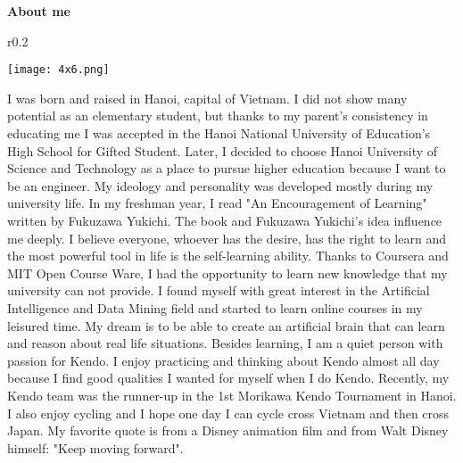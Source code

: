 \documentclass[a4paper,11pt]{article}
\newcommand{\resheading}[1]{{\large \colorbox{mygrey}{\begin{minipage}{\textwidth}{\textbf{#1 \vphantom{p\^{E}}}}\end{minipage}}}}
\begin{document}
\resheading{About me}

\begin{minipage}{\textwidth}
\begin{wrapfigure}{r}{0.2\textwidth}
  \vspace{-13pt}
  \begin{center}
    \texttt{[image: 4x6.png]}
  \end{center}
  \vspace{-20pt}
\end{wrapfigure}
\vspace{1em}
I was born and raised in Hanoi, capital of Vietnam. I did not show many potential as an elementary student, but thanks to my parent's consistency in educating me I was accepted in the Hanoi National University of Education's High School for Gifted Student. Later, I decided to choose Hanoi University of Science and Technology as a place to pursue higher education because I want to be an engineer. My ideology and personality was developed mostly during my university life. In my freshman year, I read "An Encouragement of Learning" written by Fukuzawa Yukichi. The book and Fukuzawa Yukichi's idea influence me deeply. I believe everyone, whoever has the desire, has the right to learn and the most powerful tool in life is the self-learning ability. Thanks to Coursera and MIT Open Course Ware, I had the opportunity to learn new knowledge that my university can not provide. I found myself with great interest in the Artificial Intelligence and Data Mining field and started to learn online courses in my leisured time. My dream is to be able to create an artificial brain that can learn and reason about real life situations. Besides learning, I am a quiet person with passion for Kendo. I enjoy practicing and thinking about Kendo almost all day because I find good qualities I wanted for myself when I do Kendo. Recently, my Kendo team was the runner-up in the 1st Morikawa Kendo Tournament in Hanoi. I also enjoy cycling and I hope one day I can cycle cross Vietnam and then cross Japan. My favorite quote is from a Disney animation film and from Walt Disney himself: "Keep moving forward".
\end{minipage}
\end{document}
